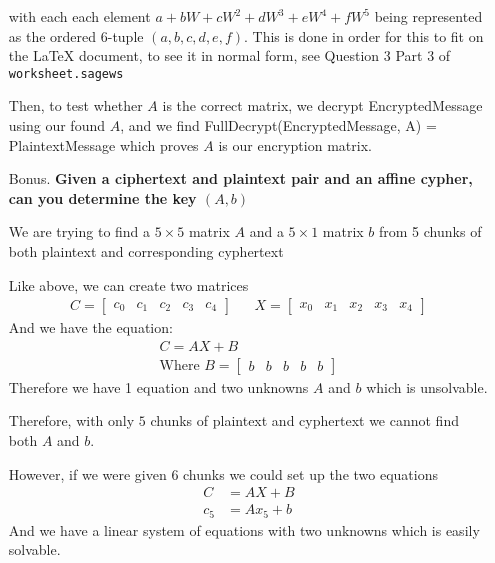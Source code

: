 \documentclass[12pt,letterpaper]{article}
\begin{document}
\begin{itemize}
    \item[ ]with each each element $a+bW+cW^2+dW^3+eW^4+fW^5$ being represented as the ordered 6-tuple $(a,b,c,d,e,f)$.
        This is done in order for this to fit on the LaTeX document, to see it in normal form, see Question 3 Part 3 of \texttt{worksheet.sagews}
        
        Then, to test whether $A$ is the correct matrix, we decrypt EncryptedMessage using our found $A$, and we find FullDecrypt(EncryptedMessage, A) = PlaintextMessage which proves $A$ is our encryption matrix.
         
        
    \item [Bonus.] \textbf{Given a ciphertext and plaintext pair and an affine cypher, can you determine the key $(A,b)$}
    
    We are trying to find a $5\times 5$ matrix $A$ and a $5\times 1$ matrix $b$ from 5 chunks of both plaintext and corresponding cyphertext
    
    Like above, we can create two matrices 
    \begin{align*}
        C =
        \begin{bmatrix}
            c_0 & c_1 & c_2 & c_3 & c_4
        \end{bmatrix}
        && X = 
        \begin{bmatrix}
            x_0 & x_1 & x_2 & x_3 & x_4
        \end{bmatrix}
    \end{align*}
    And we have the equation:
    \begin{align*}
        C = AX+B\\
        \text{Where }B=
        \begin{bmatrix}
            b   &b  &b  &b  &b
        \end{bmatrix}
    \end{align*}
    Therefore we have 1 equation and two unknowns $A$ and $b$ which is unsolvable.
    
    Therefore, with only $5$ chunks of plaintext and cyphertext we cannot find both $A$ and $b$. 
    
    However, if we were given 6 chunks we could set up the two equations 
    \begin{align*}
        C&=AX+B\\
        c_5&=Ax_5+b
    \end{align*}
    And we have a linear system of equations with two unknowns which is easily solvable.
\end{itemize}
    
\end{document}
